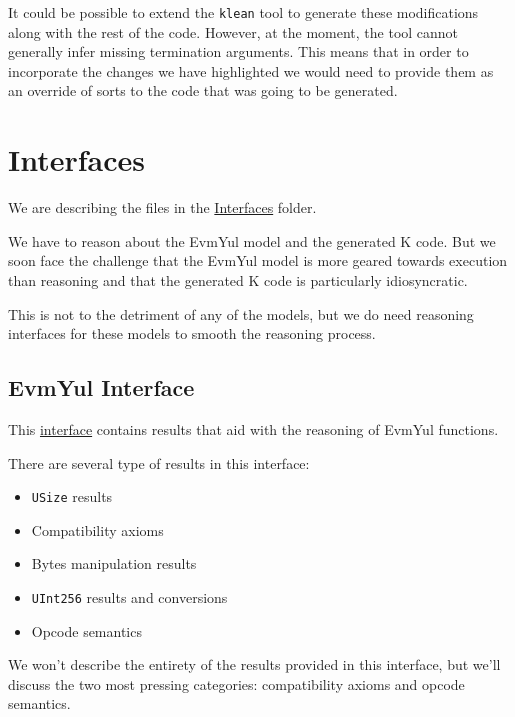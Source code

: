 It could be possible to extend the \texttt{klean} tool to generate these modifications along with the rest of the code. However, at the moment, the tool cannot generally infer missing termination arguments. This means that in order to incorporate the changes we have highlighted we would need to provide them as an override of sorts to the code that was going to be generated.


\chapter{Interfaces}\label{chap:interfaces}

We are describing the files in the
\href{https://github.com/runtimeverification/evm-equivalence/tree/master/EvmEquivalence/Interfaces}{Interfaces}
folder.

We have to reason about the EvmYul model and the generated K code. But we soon
face the challenge that the EvmYul model is more geared towards execution than
reasoning and that the generated K code is particularly idiosyncratic.

This is not to the detriment of any of the models, but we do need reasoning
interfaces for these models to smooth the reasoning process.

\section{EvmYul Interface}

This
\href{https://github.com/runtimeverification/evm-equivalence/blob/master/EvmEquivalence/Interfaces/EvmYulInterface.lean}{interface}
contains results that aid with the reasoning of EvmYul functions.

There are several type of results in this interface:

\begin{itemize}
\item \texttt{USize} results
\item Compatibility axioms
\item Bytes manipulation results
\item \texttt{UInt256} results and conversions
\item Opcode semantics
\end{itemize}

We won't describe the entirety of the results provided in this interface, but
we'll discuss the two most pressing categories: compatibility axioms and opcode semantics.

